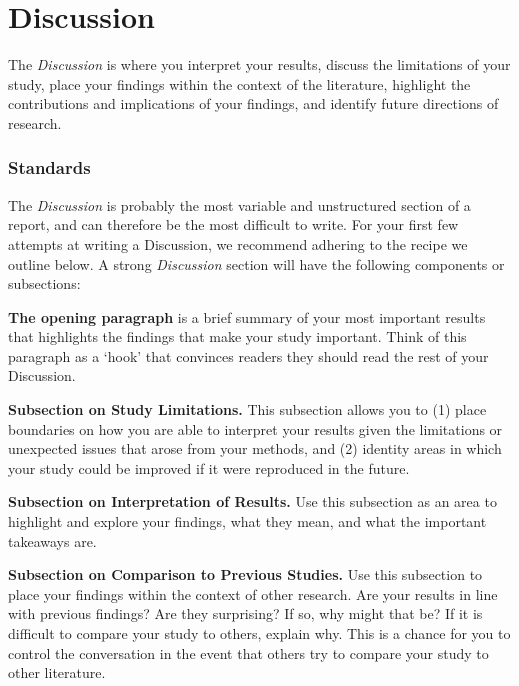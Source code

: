 \documentclass[
]{book}
\begin{document}
\hypertarget{discussion}{%
\section*{Discussion}\label{discussion}}

The \emph{Discussion} is where you interpret your results, discuss the limitations of your study, place your findings within the context of the literature, highlight the contributions and implications of your findings, and identify future directions of research.

\hypertarget{standards-4}{%
\subsubsection*{Standards}\label{standards-4}}

The \emph{Discussion} is probably the most variable and unstructured section of a report, and can therefore be the most difficult to write. For your first few attempts at writing a Discussion, we recommend adhering to the recipe we outline below. A strong \emph{Discussion} section will have the following components or subsections:

\textbf{The opening paragraph} is a brief summary of your most important results that highlights the findings that make your study important. Think of this paragraph as a `hook' that convinces readers they should read the rest of your Discussion.

\textbf{Subsection on Study Limitations.} This subsection allows you to (1) place boundaries on how you are able to interpret your results given the limitations or unexpected issues that arose from your methods, and (2) identity areas in which your study could be improved if it were reproduced in the future.

\textbf{Subsection on Interpretation of Results.} Use this subsection as an area to highlight and explore your findings, what they mean, and what the important takeaways are.

\textbf{Subsection on Comparison to Previous Studies.} Use this subsection to place your findings within the context of other research. Are your results in line with previous findings? Are they surprising? If so, why might that be? If it is difficult to compare your study to others, explain why. This is a chance for you to control the conversation in the event that others try to compare your study to other literature.
\end{document}
